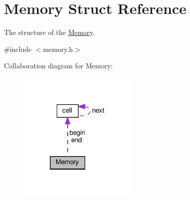 \hypertarget{structMemory}{}\section{Memory Struct Reference}
\label{structMemory}


The structure of the \hyperlink{structMemory}{Memory}.  




{\ttfamily \#include $<$memory.\+h$>$}



Collaboration diagram for Memory\+:
\nopagebreak
\begin{figure}[H]
\begin{center}
\leavevmode
\includegraphics[width=162pt]{structMemory__coll__graph}
\end{center}
\end{figure}
